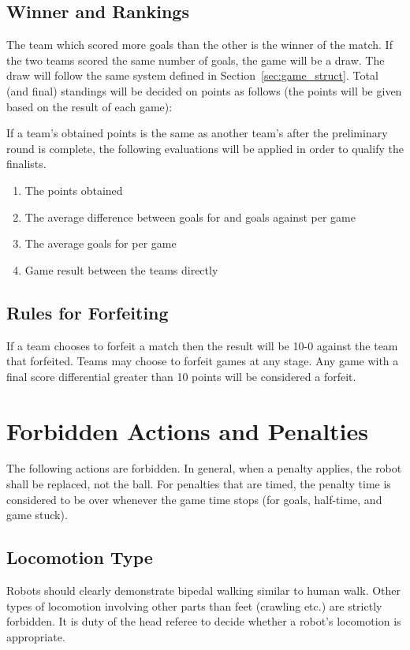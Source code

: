 \documentclass[12pt]{article}
\begin{document}
\subsection{Winner and Rankings}
The team which scored more goals than the other is the winner of the
match. If the two teams scored the same number of goals, the game
will be a draw. The draw will follow the same system defined in
Section~\ref{sec:game_struct}. Total (and final) standings will be
decided on points as follows (the points will be given based on the
result of each game):


If a team's obtained points is the same as another team's after the
preliminary round is complete, the following evaluations will be
applied in order to qualify the finalists.

\begin{enumerate}
\item The points obtained
\item The average difference between goals for and goals against per game
\item The average goals for per game
\item Game result between the teams directly
\end{enumerate}


\subsection{Rules for Forfeiting}

If a team chooses to forfeit a match then the result will be 10-0 against the
team that forfeited. Teams may choose to forfeit games at any stage. Any game
with a final score differential greater than 10 points will be considered a forfeit.

\section{Forbidden Actions and Penalties}
\label{sec:forbidden_act}

The following actions are forbidden. In general, when a penalty
applies, the robot shall be replaced, not the ball.  For penalties
that are timed, the penalty time is considered to be over whenever
the game time stops (for goals, half-time, and game stuck).

\subsection{Locomotion Type}
\label{sec:locomotion_type}
Robots should clearly demonstrate bipedal walking similar to human walk. Other types of locomotion involving other parts than feet (crawling etc.) are strictly forbidden. It is duty of the head referee to decide whether a robot's locomotion is appropriate.
\end{document}
